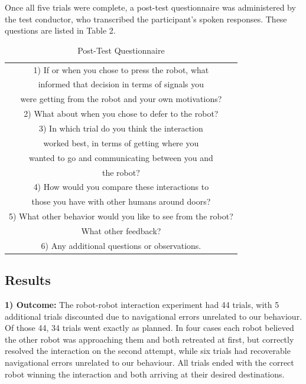 \documentclass[letterpaper, 10 pt, conference]{ieeeconf}  %
\begin{document}
Once all five trials were complete, a post-test questionnaire was administered by the test conductor, who transcribed the participant’s spoken responses. These questions are listed in Table 2.

\begin{table}[h]
\caption{Post-Test Questionnaire}
\label{questionnaire_questions}
\begin{center}
\begin{tabular}{|c|}
\hline
1) If or when you chose to press the robot, what \\
informed that decision in terms of signals you \\
were getting from the robot and your own motivations?\\
\hline
2) What about when you chose to defer to the robot?\\
\hline
3) In which trial do you think the interaction \\
worked best, in terms of getting where you \\
wanted to go and communicating between you and \\
the robot?\\
\hline
4) How would you compare these interactions to \\
those you have with other humans around doors?\\
\hline
5) What other behavior would you like to see from the robot? \\
What other feedback?\\
\hline
6) Any additional questions or observations.\\
\hline
\end{tabular}
\end{center}
\end{table}

\subsection{Results}



\textbf{1) Outcome:} The robot-robot interaction experiment had 44 trials, with 5 additional trials discounted due to navigational errors unrelated to our behaviour. Of those 44, 34 trials went exactly as planned.  In four cases each robot believed the other robot was approaching them and both retreated at first, but correctly resolved the interaction on the second attempt, while six trials had recoverable navigational errors unrelated to our behaviour. All trials ended with the correct robot winning the interaction and both arriving at their desired destinations.
\end{document}
